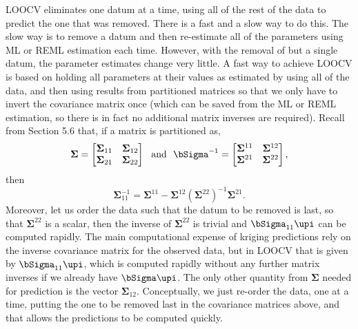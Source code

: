\documentclass[12pt, titlepage]{article}
\begin{document}
LOOCV eliminates one datum at a time, using all of the rest of the data to predict the one that was removed.  There is a fast and a slow way to do this.  The slow way is to remove a datum and then re-estimate all of the parameters using ML or REML estimation each time.  However, with the removal of but a single datum, the parameter estimates change very little.  A fast way to achieve LOOCV is based on holding all parameters at their values as estimated by using all of the data, and then using results from partitioned matrices so that we only have to invert the covariance matrix once (which can be saved from the ML or REML estimation, so there is in fact no additional matrix inverses are required).  Recall from Section 5.6 that,
if a matrix is partitioned as,
$$
    \boldsymbol{\Sigma} = 
    \begin{bmatrix}
       \boldsymbol{\Sigma}_{11} & \boldsymbol{\Sigma}_{12} \\
       \boldsymbol{\Sigma}_{21} & \boldsymbol{\Sigma}_{22}
    \end{bmatrix}  \ \textrm{ and } \  
    \bSigma^{-1} = 
    \begin{bmatrix}
       \boldsymbol{\Sigma}^{11} & \boldsymbol{\Sigma}^{12} \\
       \boldsymbol{\Sigma}^{21} & \boldsymbol{\Sigma}^{22}
    \end{bmatrix}, 
$$
then 
$$
    \boldsymbol{\Sigma}_{11}^{-1} = \boldsymbol{\Sigma}^{11} - \boldsymbol{\Sigma}^{12} (\boldsymbol{\Sigma}^{22})^{-1} \boldsymbol{\Sigma}^{21}.
$$
Moreover, let us order the data such that the datum to be removed is last, so that $\boldsymbol{\Sigma}^{22}$ is a scalar, then the inverse of $\boldsymbol{\Sigma}^{22}$ is trivial and $\bSigma_{11} \upi$ can be computed rapidly. The main computational expense of kriging predictions rely on the inverse covariance matrix for the observed data, but in LOOCV that is given by $\bSigma_{11} \upi$, which is computed rapidly without any further matrix inverses if we already have $\bSigma \upi$. The only other quantity from $\boldsymbol{\Sigma}$ needed for prediction is the vector $\boldsymbol{\Sigma}_{12}$.  Conceptually, we just re-order the data, one at a time, putting the one to be removed last in the covariance matrices above, and that allows the predictions to be computed quickly.
\end{document}
